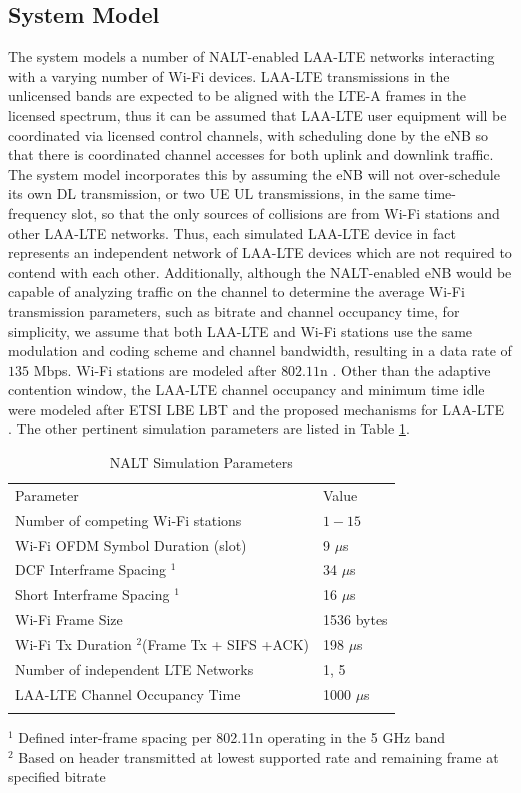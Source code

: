 \subsection{System Model}
\label{sys-model}
The system models a number of NALT-enabled LAA-LTE networks interacting with a varying number of Wi-Fi devices.  LAA-LTE transmissions in the unlicensed bands are expected to be aligned with the LTE-A frames in the licensed spectrum, thus it can be assumed that \mbox{LAA-LTE} user equipment will be coordinated via licensed control channels, with scheduling done by the eNB so that there is coordinated channel accesses for both uplink and downlink traffic.  The system model incorporates this by assuming the eNB will not over-schedule its own DL transmission, or two UE UL transmissions, in the same time-frequency slot, so that the only sources of collisions are from Wi-Fi stations and other LAA-LTE networks. Thus, each simulated LAA-LTE device in fact represents an independent network of LAA-LTE devices which are not required to contend with each other. Additionally, although the NALT-enabled eNB would be capable of analyzing traffic on the channel to determine the average Wi-Fi transmission parameters, such as bitrate and channel occupancy time, for simplicity, we assume that both \mbox{LAA-LTE} and \mbox{Wi-Fi} stations use the same modulation and coding scheme and channel bandwidth, resulting in a data rate of $135$ Mbps.  Wi-Fi stations are modeled after $802.11$n \cite{80211}.  Other than the adaptive contention window, the LAA-LTE channel occupancy and minimum time idle were modeled after ETSI LBE LBT and the proposed mechanisms for \mbox{LAA-LTE} \cite{3gpp}.  The other pertinent simulation parameters are listed in Table \ref{params}.
\begin{table}
	\caption{NALT Simulation Parameters}
	\label{params}      
	\begin{tabular}{p{8cm}p{4cm}}
		\hline\noalign{\smallskip}
		Parameter & Value \\
		\noalign{\smallskip}\svhline\noalign{\smallskip}
		Number of competing \mbox{Wi-Fi} stations& $1 - 15$ \\ 
		Wi-Fi OFDM Symbol Duration (slot) & 9 $\mu$s    \\ 
		DCF Interframe Spacing $^1$ & 34 $\mu$s   \\ 
		Short Interframe Spacing $^1$ & 16 $\mu$s   \\ 
		\mbox{Wi-Fi} Frame Size & 1536 bytes  \\ 
		\mbox{Wi-Fi} Tx Duration $^2$(Frame Tx + SIFS +ACK) & 198 $\mu$s   \\ 
		Number of independent LTE Networks & 1, 5 \\
		\mbox{LAA-LTE} Channel Occupancy Time  & 1000 $\mu$s \\ 	
		\noalign{\smallskip}\hline\noalign{\smallskip}
	\end{tabular}
	$^1$ Defined inter-frame spacing per 802.11n operating in the 5 GHz band \\
	$^2$ Based on header transmitted at lowest supported rate and remaining frame at specified bitrate	 
\end{table}

